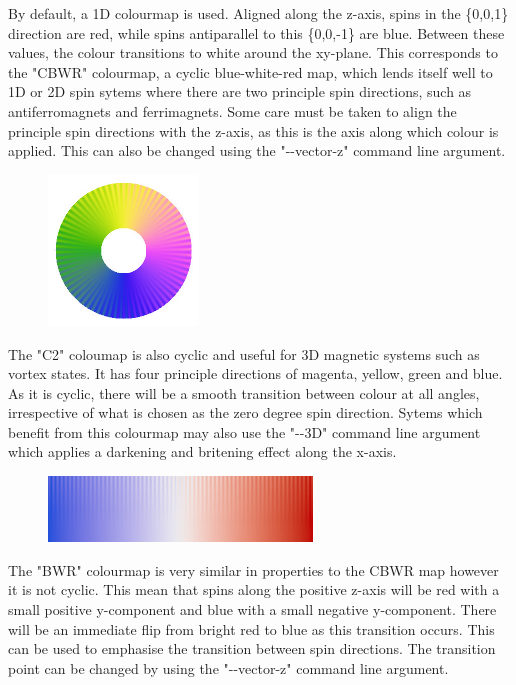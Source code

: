 By default, a 1D colourmap is used. Aligned along the z-axis, spins in the \{0,0,1\} direction are red, while spins antiparallel to this \{0,0,-1\} are blue. Between these values, the colour transitions to white around the xy-plane. This corresponds to the "CBWR" colourmap, a cyclic blue-white-red map, which lends itself well to 1D or 2D spin sytems where there are two principle spin directions, such as antiferromagnets and ferrimagnets. Some care must be taken to align the principle spin directions with the z-axis, as this is the axis along which colour is applied. This can also be changed using the "-{}-vector-z" command line argument.   \\

\begin{figure}[!h]
\center
\includegraphics[width=4cm]{figures/C2_colourmap.jpg}
\label{fig:C2_colourmap}
\end{figure}

The "C2" coloumap is also cyclic and useful for 3D magnetic systems such as vortex states. It has four principle directions of magenta, yellow, green and blue. As it is cyclic, there will be a smooth transition between colour at all angles, irrespective of what is chosen as the zero degree spin direction. Sytems which benefit from this colourmap may also use the "-{}-3D" command line argument which applies a darkening and britening effect along the x-axis. \\

\begin{figure}[!h]
\center
\includegraphics[width=7cm]{figures/BWR_colourmap.jpg}
\label{fig:BWR_colourmap}
\end{figure}

The "BWR" colourmap is very similar in properties to the CBWR map however it is not cyclic. This mean that spins along the positive z-axis will be red with a small positive y-component and blue with a small negative y-component. There will be an immediate flip from bright red to blue as this transition occurs. This can be used to emphasise the transition between spin directions. The transition point can be changed by using the "-{}-vector-z" command line argument. \\


